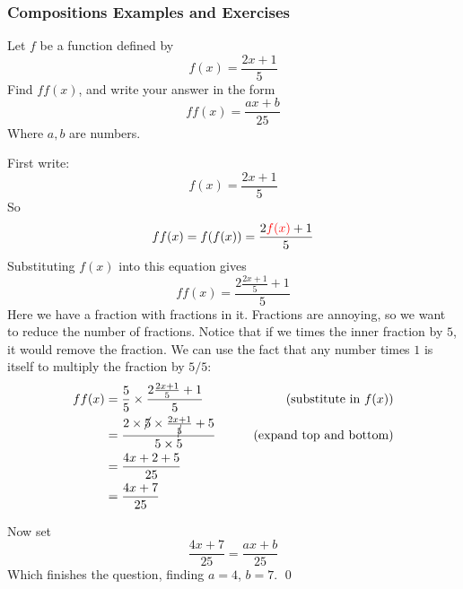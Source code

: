 \subsubsection{Compositions Examples and Exercises}
\begin{example} \label{ex:simple-composition}
    Let $f$ be a function defined by 
    \[ f(x) = \frac{2x + 1}{5}\]
    Find $ff(x)$, and write your answer in the form
    \[ff(x) = \frac{ax + b}{25}\]
    Where $a,b$ are numbers.
\end{example}
\begin{solution}
    First write:
    \[ f(x) = \frac{2x + 1}{5}\]
    So 
    \[ ff(x) = f(f(x)) = \frac{2\textcolor{red}{f(x)} + 1}{5}\]
    Substituting $f(x)$ into this equation gives 
    \[ ff(x) =  \frac{2\frac{2x + 1}{5} + 1}{5}\]
    Here we have a fraction with fractions in it. Fractions are annoying, so we want to reduce the number of fractions. Notice that if we times the inner fraction by $5$, it would remove the fraction. 
    We can use the fact that any number times $1$ is itself to multiply the fraction by $5/5$:
    \begin{align*}
        ff(x) &=  \frac{5}{5} \times \frac{2\frac{2x + 1}{5} + 1}{5} & \tag*{(substitute in $f(x)$)}\\
            &= \frac{2\times \cancel{5} \times \frac{2x + 1}{\cancel{5}} +5}{5 \times 5} & \tag*{(expand top and bottom)}\\
            &= \frac{4x + 2 + 5}{25} \\
            &= \frac{4x + 7}{25}
    \end{align*}

    Now set 
    \[ \frac{4x + 7}{25} = \frac{ax + b}{25}\]
    Which finishes the question, finding $a = 4$, $b = 7$.
    \qed
\end{solution}



